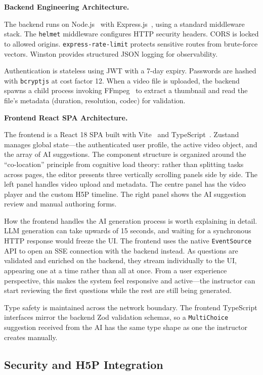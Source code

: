 \textbf{Backend Engineering Architecture.}

The backend runs on Node.js~\cite{nodejs2023} with Express.js~\cite{expressjs2023}, using a standard middleware stack. The \texttt{helmet} middleware configures HTTP security headers. CORS is locked to allowed origins. \texttt{express-rate-limit} protects sensitive routes from brute-force vectors. Winston provides structured JSON logging for observability.

Authentication is stateless using JWT with a 7-day expiry. Passwords are hashed with \texttt{bcryptjs} at cost factor 12. When a video file is uploaded, the backend spawns a child process invoking FFmpeg~\cite{ffmpeg2023} to extract a thumbnail and read the file's metadata (duration, resolution, codec) for validation.

\textbf{Frontend React SPA Architecture.}

The frontend is a React 18 SPA built with Vite~\cite{vite2023} and TypeScript~\cite{typescript2023}. Zustand manages global state---the authenticated user profile, the active video object, and the array of AI suggestions. The component structure is organized around the ``co-location'' principle from cognitive load theory: rather than splitting tasks across pages, the editor presents three vertically scrolling panels side by side. The left panel handles video upload and metadata. The centre panel has the video player and the custom H5P timeline. The right panel shows the AI suggestion review and manual authoring forms.

How the frontend handles the AI generation process is worth explaining in detail. LLM generation can take upwards of 15 seconds, and waiting for a synchronous HTTP response would freeze the UI. The frontend uses the native \texttt{EventSource} API to open an SSE connection with the backend instead. As questions are validated and enriched on the backend, they stream individually to the UI, appearing one at a time rather than all at once. From a user experience perspective, this makes the system feel responsive and active---the instructor can start reviewing the first questions while the rest are still being generated.

Type safety is maintained across the network boundary. The frontend TypeScript interfaces mirror the backend Zod validation schemas, so a \texttt{MultiChoice} suggestion received from the AI has the same type shape as one the instructor creates manually.
\clearpage
\subsection{Security and H5P Integration}

